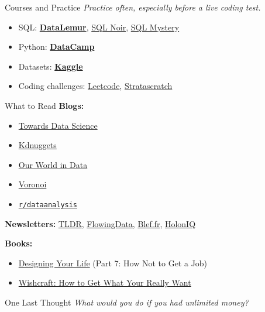 \documentclass[10pt,a4paper]{article}
\begin{document}
\begin{multicols}{3}
\begin{textboxYellow}{Courses and Practice}
\emph{Practice often, especially before a live coding test.}

\begin{itemize}
    \item SQL: \href{https://datalemur.com/}{\textbf{DataLemur}}, \href{https://www.sqlnoir.com/}{SQL Noir}, \href{https://mystery.knightlab.com/}{SQL Mystery}
    \item Python: \href{https://datacamp.com/}{\textbf{DataCamp}}
    \item Datasets: \href{https://www.kaggle.com/}{\textbf{Kaggle}}
    \item Coding challenges: \href{https://leetcode.com/}{Leetcode}, \href{https://www.stratascratch.com/}{Stratascratch}
\end{itemize}
\end{textboxYellow}

\begin{textboxYellow}{What to Read}
\textbf{Blogs:}
\begin{itemize}
    \item \href{https://towardsdatascience.com/}{Towards Data Science}
    \item \href{https://www.kdnuggets.com/}{Kdnuggets}
    \item \href{https://ourworldindata.org/}{Our World in Data}
    \item \href{https://www.voronoiapp.com/}{Voronoi}
    \item \href{https://reddit.com/r/dataanalysis/}{\texttt{r/dataanalysis}}
\end{itemize}
\textbf{Newsletters:} \href{https://tldr.tech/newsletters}{TLDR}, \href{https://flowingdata.com/newsletter/}{FlowingData}, \href{https://www.blef.fr/}{Blef.fr}, \href{https://www.holoniq.com/newsletters}{HolonIQ}

\textbf{Books:}
\begin{itemize}
    \item \href{https://www.amazon.com/Designing-Your-Life-Well-Lived-Joyful/dp/1101923083}{Designing Your Life} (Part 7: How Not to Get a Job)
    \item \href{https://www.amazon.com/Wishcraft-How-What-Really-Want/dp/0345465180}{Wishcraft: How to Get What Your Really Want}
\end{itemize}
\end{textboxYellow}

\begin{textbox}{One Last Thought}
\emph{What would you do if you had unlimited money?}
\end{textbox}


\date{\today}
\end{multicols}
\end{document}
